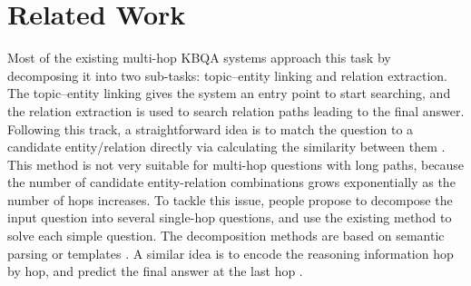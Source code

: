\section{Related Work}

Most of the existing multi-hop KBQA systems %
approach this task by decomposing it into two sub-tasks:
topic--entity linking and relation extraction. The topic--entity linking gives the system an entry point to start searching, and the relation extraction is used to search relation paths leading to the final answer. %
Following this track, a straightforward idea is to match the question to a candidate entity/relation directly via calculating the similarity between them \cite{DBLP:journals/corr/abs-1801-09893,DBLP:conf/adbis/YuHYZW18,DBLP:conf/ijcai/LanW019}. This method is not very suitable for multi-hop questions with long paths, because the number of candidate entity-relation combinations grows exponentially as the number of hops increases. To tackle this issue, people propose to decompose the input question into several single-hop questions, and use the existing method to solve each simple question. The decomposition methods are based on semantic parsing \cite{DBLP:conf/www/AbujabalYRW17,DBLP:conf/emnlp/LuoLLZ18} or templates \cite{DBLP:journals/corr/abs-1908-11053}. A similar idea is to encode the reasoning information hop by hop, and predict the final answer at the last hop \cite{DBLP:conf/emnlp/MillerFDKBW16,DBLP:conf/coling/ZhouHZ18,DBLP:conf/naacl/ChenCCNK19}. %
